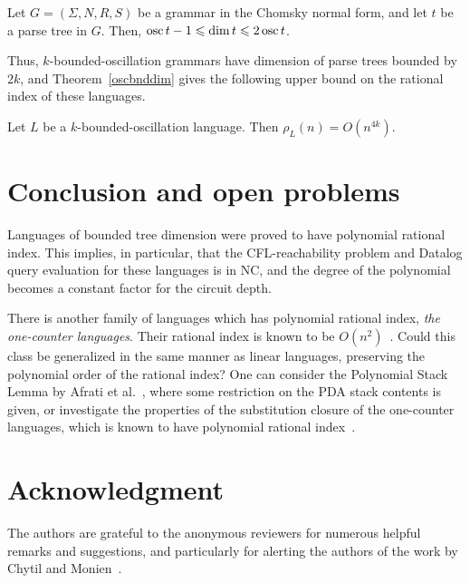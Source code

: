 \documentclass[runningheads]{llncs}
\DeclareMathOperator{\osc}{\textup{osc}}
\begin{document}
\begin{lemma}\label{boscdim}
Let $G = (\Sigma, N, R, S)$ be a grammar in the Chomsky normal form,
and let $t$ be a parse tree in $G$.
Then, $\osc t - 1 \leqslant \dim t \leqslant 2\osc t$.
\end{lemma}

Thus, $k$-bounded-oscillation grammars have dimension of parse trees bounded by $2k$,
and Theorem~\ref{oscbnddim} gives the following upper bound on the rational index
of these languages.
\begin{corollary}
Let $L$ be a $k$-bounded-oscillation language.
Then $\rho_{L}(n) = O(n^{4k})$.
\end{corollary}







\section{Conclusion and open problems}\label{section_conclusion}

Languages of bounded tree dimension were proved to have polynomial rational index.
This implies, in particular,
that the CFL-reachability problem and Datalog query evaluation for these languages is in NC,
and the degree of the polynomial becomes a constant factor for the circuit depth.

There is another family of languages which has polynomial rational index,
\emph{the one-counter languages}.
Their rational index is known to be $O(n^2)$~\cite{OneCount}.
Could this class be generalized in the same manner as linear languages,
preserving the polynomial order of the rational index?
One can consider the Polynomial Stack Lemma by Afrati et al.~\cite{ChainQ},
where some restriction on the PDA stack contents is given,
or investigate the properties of the substitution closure of the one-counter languages,
which is known to have polynomial rational index~\cite{RatBasic}. 





\section*{Acknowledgment}

The authors are grateful to the anonymous reviewers
for numerous helpful remarks and suggestions,
and particularly for alerting the authors
of the work by Chytil and Monien~\cite{ChytilMonien}.






\end{document}
